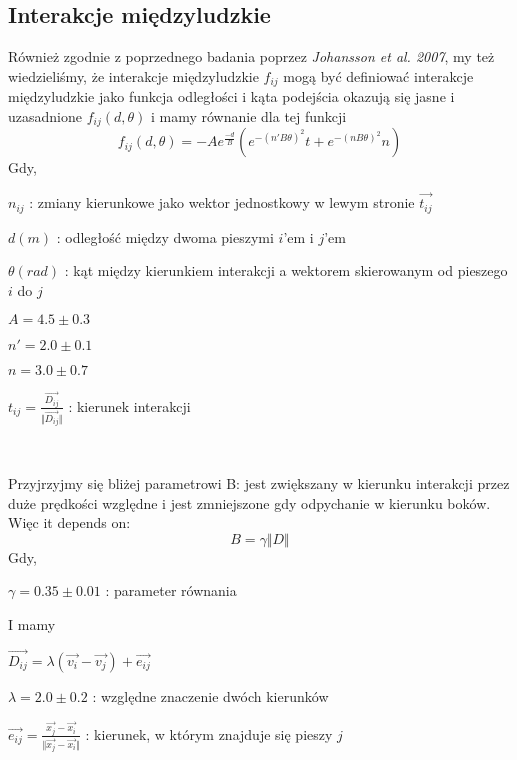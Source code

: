 \subsection{Interakcje międzyludzkie}
\hspace{4ex}Również zgodnie z poprzednego badania poprzez {\it Johansson et al. 2007}, my też wiedzieliśmy, że interakcje międzyludzkie $f_{ij}$ mogą być definiować interakcje międzyludzkie jako funkcja odległości i kąta podejścia okazują się jasne i uzasadnione $f_{ij}(d,\theta)$ i mamy równanie dla tej funkcji
\newpage
$$
f_{ij}(d,\theta) = -Ae^{\frac{-d}{B}}(e^{-(n'B\theta)^2}t + e^{-(nB\theta)^2}n)
$$
Gdy,\\
\centerline{$n_{ij}$ : zmiany kierunkowe jako wektor jednostkowy w lewym stronie $\vec{t_{ij}}$}
\centerline{$d(m)$ : odległość między dwoma pieszymi $i$'em i $j$'em}
\centerline{$\theta(rad)$ : kąt między kierunkiem interakcji a wektorem skierowanym od pieszego $i$ do $j$}
\centerline{$A = 4.5 \pm 0.3$}
\centerline{$n' = 2.0 \pm 0.1$}
\centerline{$n = 3.0 \pm 0.7$}
\centerline{$t_{ij} = \frac{\vec{D_{ij}}}{\Vert \vec{D_{ij}} \Vert}$ : kierunek interakcji}\\
\par
Przyjrzyjmy się bliżej parametrowi B: jest zwiększany w kierunku interakcji przez duże prędkości względne i jest zmniejszone gdy odpychanie w kierunku boków. Więc it depends on:
$$
B = \gamma \Vert D \Vert
$$
Gdy,\\
\centerline{$\gamma = 0.35 \pm 0.01$ : parameter równania}
I mamy \\ \centerline{$\vec{D_{ij}} = \lambda(\vec{v_i} - \vec{v_j}) + \vec{e_{ij}}$}
\centerline{$\lambda = 2.0 \pm 0.2$ : względne znaczenie dwóch kierunków}
\centerline{$\vec{e_{ij}} = \frac{\vec{x_j}-\vec{x_i}}{\Vert \vec{x_j} - \vec{x_i} \Vert}$ : kierunek, w którym znajduje się pieszy $j$}
